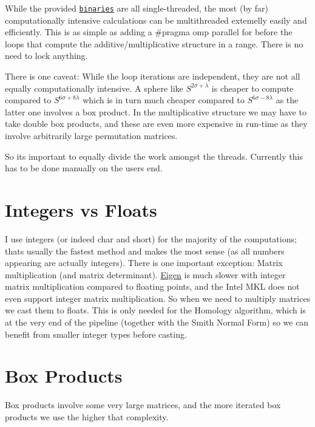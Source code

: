 \begin{DoxyItemize}
\item While the provided \href{https://github.com/NickG-Math/Mackey/tree/master/bin}{\tt binaries} are all single-\/threaded, the most (by far) computationally intensive calculations can be multithreaded extemelly easily and efficiently. This is as simple as adding a {\ttfamily \#pragma omp parallel for} before the loops that compute the additive/multiplicative structure in a range. There is no need to lock anything.
\item There is one caveat\+: While the loop iterations are independent, they are not all equally computationally intensive. A sphere like $S^{2\sigma+\lambda}$ is cheaper to compute compared to $S^{6\sigma+8\lambda}$ which is in turn much cheaper compared to $S^{6\sigma-8\lambda}$ as the latter one involves a box product. In the multiplicative structure we may have to take double box products, and these are even more expensive in run-\/time as they involve arbitrarily large permutation matrices.
\item So it\textquotesingle{}s important to equally divide the work amongst the threads. Currently this has to be done manually on the user\textquotesingle{}s end.
\end{DoxyItemize}\hypertarget{perf_intvsfloat}{}\section{Integers vs Floats}\label{perf_intvsfloat}
I use integers (or indeed {\ttfamily char} and {\ttfamily short}) for the majority of the computations; that\textquotesingle{}s usually the fastest method and makes the most sense (as all numbers appearing are actually integers). There is one important exception\+: Matrix multiplication (and matrix determinant). \hyperlink{namespaceEigen}{Eigen} is much slower with integer matrix multiplication compared to floating points, and the Intel M\+KL does not even support integer matrix multiplication. So when we need to multiply matrices we cast them to floats. This is only needed for the Homology algorithm, which is at the very end of the pipeline (together with the Smith Normal Form) so we can benefit from smaller integer types before casting.\hypertarget{perf_boxproducts}{}\section{Box Products}\label{perf_boxproducts}
Box products involve some very large matrices, and the more iterated box products we use the higher that complexity.


